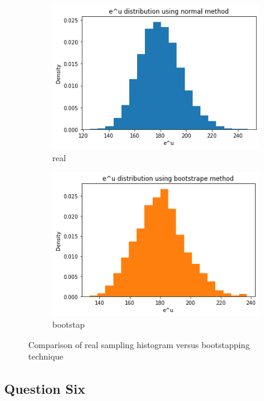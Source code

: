 \documentclass[12pt, a4paper]{book}
\begin{document}
\begin{figure}[h]
    \begin{subfigure}{0.45\linewidth}
        \centering
        \includegraphics[width=\linewidth]{image/q5/real.png}
        \caption{real}
    \end{subfigure}
    \hfil
    \begin{subfigure}{0.45\linewidth}
        \centering
        \includegraphics[width=\linewidth]{image/q5/bootstrap.png}
        \caption{bootstap}
    \end{subfigure}
    \caption{Comparison of real sampling histogram versus bootstapping technique}
    \label{real_bootstapping}
\end{figure}

\subsection*{Question Six}
\end{document}
